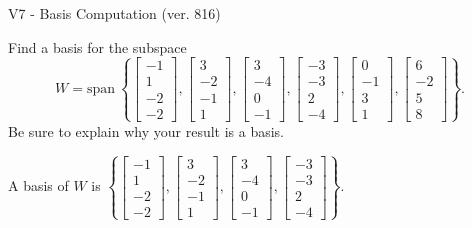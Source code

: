 \begin{exercise}
  \begin{exerciseTitle}V7 - Basis Computation (ver. 816)\end{exerciseTitle}
  \begin{exerciseStatement}
    Find a basis for the subspace 
\[W=\mathrm{span}\ \left\{\left[\begin{array}{r}
-1 \\
1 \\
-2 \\
-2
\end{array}\right] , \left[\begin{array}{r}
3 \\
-2 \\
-1 \\
1
\end{array}\right] , \left[\begin{array}{r}
3 \\
-4 \\
0 \\
-1
\end{array}\right] , \left[\begin{array}{r}
-3 \\
-3 \\
2 \\
-4
\end{array}\right] , \left[\begin{array}{r}
0 \\
-1 \\
3 \\
1
\end{array}\right] , \left[\begin{array}{r}
6 \\
-2 \\
5 \\
8
\end{array}\right]\right\}.\]
 Be sure to explain why your result is a basis.


  \end{exerciseStatement}
  \begin{exerciseAnswer}
   A basis of \(W\) is  \(\left\{\left[\begin{array}{r}
-1 \\
1 \\
-2 \\
-2
\end{array}\right] , \left[\begin{array}{r}
3 \\
-2 \\
-1 \\
1
\end{array}\right] , \left[\begin{array}{r}
3 \\
-4 \\
0 \\
-1
\end{array}\right] , \left[\begin{array}{r}
-3 \\
-3 \\
2 \\
-4
\end{array}\right]\right\}\).
  


  \end{exerciseAnswer}
\end{exercise}